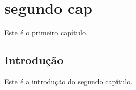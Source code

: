 \chapter{segundo cap} \label{cap:cap2}

Este \'e o primeiro cap\'itulo.

\section{Introdu\c{c}\~ao}\label{sec:intro}

Este \'e a introdu\c{c}\~ao do segundo cap\'itulo. 

